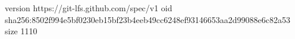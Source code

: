 version https://git-lfs.github.com/spec/v1
oid sha256:8502f994e5bf0230eb15bf23b4eeb49cc6248ef93146653aa2d99088e6c82a53
size 1110

